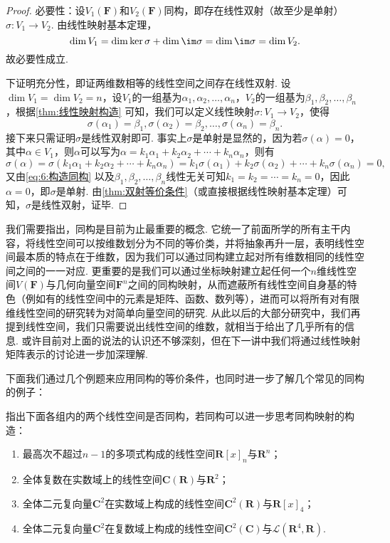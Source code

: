 \begin{proof}
    必要性：设$V_1(\mathbf{F})$和$V_2(\mathbf{F})$同构，即存在线性双射（故至少是单射）$\sigma:V_1\to V_2$. 由线性映射基本定理，
    \[\dim V_1=\dim\ker\sigma+\dim\im\sigma=\dim\im\sigma=\dim V_2.\]
    故必要性成立.

    下证明充分性，即证两维数相等的线性空间之间存在线性双射. 设$\dim V_1=\dim V_2=n$，设$V_1$的一组基为$\alpha_1,\alpha_2,\ldots,\alpha_n$，$V_2$的一组基为$\beta_1,\beta_2,\ldots,\beta_n$，根据\autoref{thm:线性映射构造} 可知，我们可以定义线性映射$\sigma:V_1\to V_2$，使得
    \begin{equation}\label{eq:6:构造同构}
        \sigma(\alpha_1)=\beta_1,\sigma(\alpha_2)=\beta_2,\ldots,\sigma(\alpha_n)=\beta_n.
    \end{equation}
    接下来只需证明$\sigma$是线性双射即可. 事实上$\sigma$是单射是显然的，因为若$\sigma(\alpha)=0$，其中$\alpha\in V_1$，则$\alpha$可以写为$\alpha=k_1\alpha_1+k_2\alpha_2+\cdots+k_n\alpha_n$，则有
    \[\sigma(\alpha)=\sigma(k_1\alpha_1+k_2\alpha_2+\cdots+k_n\alpha_n)=k_1\sigma(\alpha_1)+k_2\sigma(\alpha_2)+\cdots+k_n\sigma(\alpha_n)=0,\]
    又由\autoref{eq:6:构造同构} 以及$\beta_1,\beta_2,\ldots,\beta_n$线性无关可知$k_1=k_2=\cdots=k_n=0$，因此$\alpha=0$，即$\sigma$是单射. 由\autoref{thm:双射等价条件}（或直接根据线性映射基本定理）可知，$\sigma$是线性双射，证毕.
\end{proof}

我们需要指出，同构是目前为止最重要的概念. 它统一了前面所学的所有主干内容，将线性空间可以按维数划分为不同的等价类，并将抽象再升一层，表明线性空间最本质的特点在于维数，因为我们可以通过同构建立起对所有维数相同的线性空间之间的一一对应. 更重要的是我们可以通过坐标映射建立起任何一个$n$维线性空间$V(\mathbf{F})$与几何向量空间$\mathbf{F}^n$之间的同构映射，从而遮蔽所有线性空间自身基的特色（例如有的线性空间中的元素是矩阵、函数、数列等），进而可以将所有对有限维线性空间的研究转为对简单向量空间的研究. 从此以后的大部分研究中，我们再提到线性空间，我们只需要说出线性空间的维数，就相当于给出了几乎所有的信息. 或许目前对上面的说法的认识还不够深刻，但在下一讲中我们将通过线性映射矩阵表示的讨论进一步加深理解.

下面我们通过几个例题来应用同构的等价条件，也同时进一步了解几个常见的同构的例子：
\begin{example}{}{}
    指出下面各组内的两个线性空间是否同构，若同构可以进一步思考同构映射的构造：
    \begin{enumerate}
        \item 最高次不超过$n-1$的多项式构成的线性空间$\mathbf{R}[x]_n$与$\mathbf{R}^n$；

        \item 全体复数在实数域上的线性空间$\mathbf{C}(\mathbf{R})$与$\mathbf{R}^2$；

        \item 全体二元复向量$\mathbf{C}^2$在实数域上构成的线性空间$\mathbf{C}^2(\mathbf{R})$与$\mathbf{R}[x]_4$；

        \item 全体二元复向量$\mathbf{C}^2$在复数域上构成的线性空间$\mathbf{C}^2(\mathbf{C})$与$\mathcal{L}(\mathbf{R}^4,\mathbf{R})$.
    \end{enumerate}
\end{example}


